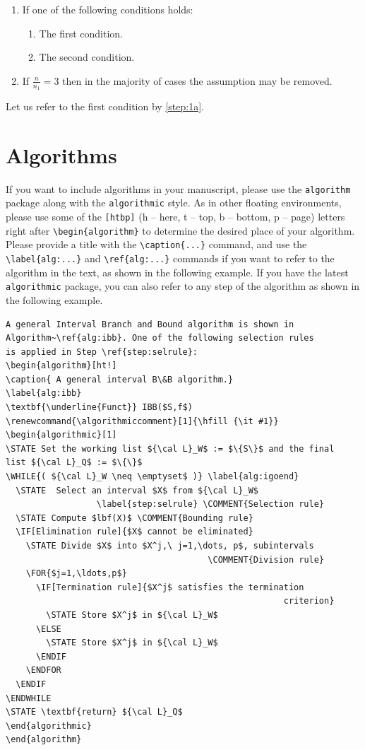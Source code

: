 \documentclass[withtitlethanks]{actacyb}
\begin{document}
\begin{enumerate}
\item If one of the following conditions holds:
\begin{enumerate}
\item The first condition.\label{step:1a}
\item The second condition.
\end{enumerate}
\item If ${\frac{n}{n_1}}=3$ then in the majority of cases the 
assumption may be removed.
\end{enumerate}

Let us refer to the first condition by \ref{step:1a}.


\section{Algorithms}

If you want to include algorithms in your manuscript, please use the \verb|algorithm| package along with the \verb|algorithmic| style.
As in other floating environments, please use some of the \verb|[htbp]| (h -- here, t -- top, b -- bottom, p -- page) letters right after \verb|\begin{algorithm}| to determine the desired place of your algorithm. Please provide a title with the \verb|\caption{...}| command, and use the \verb|\label{alg:...}| and \verb|\ref{alg:...}| commands if you want to refer to the algorithm in the text, as shown in the following example.
If you have the latest \verb|algorithmic| package, you can also refer to any step of the algorithm as shown in the following example.

\begin{verbatim}
A general Interval Branch and Bound algorithm is shown in 
Algorithm~\ref{alg:ibb}. One of the following selection rules
is applied in Step \ref{step:selrule}:
\begin{algorithm}[ht!]
\caption{ A general interval B\&B algorithm.} 
\label{alg:ibb} 
\textbf{\underline{Funct}} IBB($S,f$)
\renewcommand{\algorithmiccomment}[1]{\hfill {\it #1}}
\begin{algorithmic}[1]
\STATE Set the working list ${\cal L}_W$ := $\{S\}$ and the final 
list ${\cal L}_Q$ := $\{\}$     
\WHILE{( ${\cal L}_W \neq \emptyset$ )} \label{alg:igoend}
  \STATE  Select an interval $X$ from ${\cal L}_W$
                  \label{step:selrule} \COMMENT{Selection rule}
  \STATE Compute $lbf(X)$ \COMMENT{Bounding rule}
  \IF[Elimination rule]{$X$ cannot be eliminated}
    \STATE Divide $X$ into $X^j,\ j=1,\dots, p$, subintervals   
                                        \COMMENT{Division rule}
    \FOR{$j=1,\ldots,p$}
      \IF[Termination rule]{$X^j$ satisfies the termination 
                                                       criterion}
        \STATE Store $X^j$ in ${\cal L}_W$ 
      \ELSE
        \STATE Store $X^j$ in ${\cal L}_W$ 
      \ENDIF
    \ENDFOR  
  \ENDIF
\ENDWHILE
\STATE \textbf{return} ${\cal L}_Q$
\end{algorithmic}
\end{algorithm}
\end{verbatim}
\end{document}
